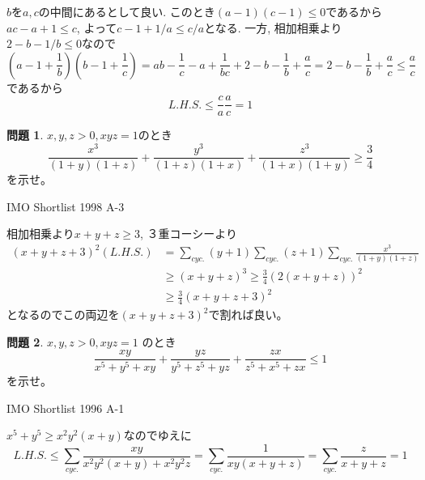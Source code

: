 \documentclass[uplatex, a5paper]{jsarticle}
\makeatletter
\theoremstyle{definition}
\newtheorem{prob}{問題}
\renewenvironment{proof}[1][\proofname]{
  \pushQED{\qed}%
  \normalfont \topsep6\p@\@plus6\p@\relax
  \trivlist
  \item[\hskip\labelsep
    #1\@addpunct{\textbf{.}}]\ignorespaces
}{%
  \popQED\endtrivlist\@endpefalse
}
\providecommand{\proofname}{証明}
\def\qed{\hfill $\Box$}
\makeatother
\begin{document}
\begin{proof}
  \(b\)を\(a,c\)の中間にあるとして良い.
  このとき\((a-1)(c-1)\leq 0\)であるから\(ac -a+1 \leq c\), よって\(c-1+1/a \leq c/a\)となる.
  一方, 相加相乗より\(2 - b - 1/b \leq 0\)なので
  \[
  \left( a-1 +\frac{1}{b} \right) \left( b-1+\frac{1}{c} \right)
  = ab -\frac{1}{c}-a+\frac{1}{bc} +2 -b-\frac{1}{b}+\frac{a}{c}
  = 2 -b-\frac{1}{b}+\frac{a}{c} \leq \frac{a}{c}
  \]
  であるから
  \[
  L.H.S.\leq \frac{c}{a}\frac{a}{c} =1
  \]
\end{proof}









\newpage

\begin{prob}
  \(x,y,z>0 , xyz=1\)のとき
  \[
  \frac{x^3}{(1+y)(1+z)} + \frac{y^3}{(1+z)(1+x)} + \frac{z^3}{(1+x)(1+y)} \geq \frac{3}{4}
  \]
  を示せ。
  \begin{flushright}
    IMO Shortlist 1998 A-3
  \end{flushright}
\end{prob}


\begin{proof}
  相加相乗より\(x+y+z \geq 3\), ３重コーシーより
  \begin{align*}
    (x+y+z+3)^2(L.H.S.) &= \sum_{cyc.}(y+1)\sum_{cyc.}(z+1)\sum_{cyc.}\frac{x^3}{(1+y)(1+z)} \\
    &\geq (x+y+z)^3 \geq \frac{3}{4}\left( 2(x+y+z) \right) ^2  \\
    &\geq \frac{3}{4}\left( x+y+z+3 \right) ^2
  \end{align*}
  となるのでこの両辺を\((x+y+z+3)^2\)で割れば良い。
\end{proof}











\newpage


\begin{prob}
  \(x,y,z>0,xyz=1\)
  のとき
  \[
  \frac{xy}{x^5+y^5+xy} + \frac{yz}{y^5+z^5+yz} + \frac{zx}{z^5+x^5+zx} \leq 1
  \]
  を示せ。
  \begin{flushright}
    IMO Shortlist 1996 A-1
  \end{flushright}
\end{prob}


\begin{proof}
  \(x^5+y^5 \geq x^2y^2(x+y)\)なのでゆえに
  \[
  L.H.S. \leq \sum_{cyc.}\frac{xy}{x^2y^2(x+y)+x^2y^2z}
  = \sum_{cyc.}\frac{1}{xy(x+y+z)}
  =  \sum_{cyc.}\frac{z}{x+y+z} = 1
  \]
\end{proof}
\end{document}
